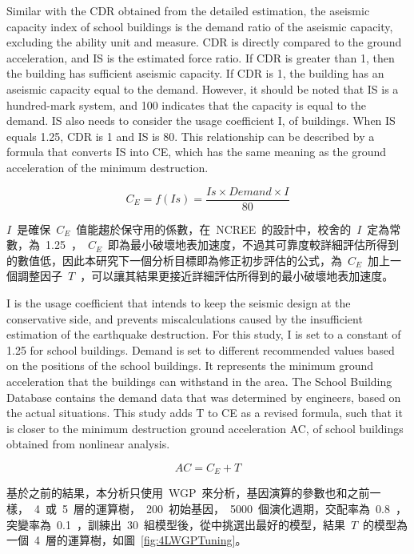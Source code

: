 Similar with the CDR obtained from the detailed estimation, the aseismic capacity index of school buildings is the demand ratio of the aseismic capacity, excluding the ability unit and measure. CDR is directly compared to the ground acceleration, and IS is the estimated force ratio. If CDR is greater than 1, then the building has sufficient aseismic capacity. If CDR is 1, the building has an aseismic capacity equal to the demand. However, it should be noted that IS is a hundred-mark system, and 100 indicates that the capacity is equal to the demand. IS also needs to consider the usage coefficient I, of buildings. When IS equals 1.25, CDR is 1 and IS is 80. This relationship can be described by a formula that converts IS into CE, which has the same meaning as the ground acceleration of the minimum destruction.

\begin{equation} C_E = f(Is) = \dfrac{Is \times Demand \times I}{80}  \label{eq:CE}\end{equation}

$I$~是確保~$C_E$~值能趨於保守用的係數，在~NCREE~的設計中，校舍的~$I$~定為常數，為~1.25~，~$C_E$~即為最小破壞地表加速度，不過其可靠度較詳細評估所得到的數值低，因此本研究下一個分析目標即為修正初步評估的公式，為~$C_E$~加上一個調整因子~$T$~，可以讓其結果更接近詳細評估所得到的最小破壞地表加速度。

I is the usage coefficient that intends to keep the seismic design at the conservative side, and prevents miscalculations caused by the insufficient estimation of the earthquake destruction. For this study, I is set to a constant of 1.25 for school buildings. Demand is set to different recommended values based on the positions of the school buildings. It represents the minimum ground acceleration that the buildings can withstand in the area. The School Building Database contains the demand data that was determined by engineers, based on the actual situations. This study adds T to CE as a revised formula, such that it is closer to the minimum destruction ground acceleration AC, of school buildings obtained from nonlinear analysis.

\begin{equation} AC = C_E + T  \label{eq:AC}\end{equation}

基於之前的結果，本分析只使用~WGP~來分析，基因演算的參數也和之前一樣，~4~或~5~層的運算樹，~200~初始基因，~5000~個演化週期，交配率為~0.8~，突變率為~0.1~，訓練出~30~組模型後，從中挑選出最好的模型，結果~$T$~的模型為一個~4~層的運算樹，如圖~\ref{fig:4LWGPTuning}。

